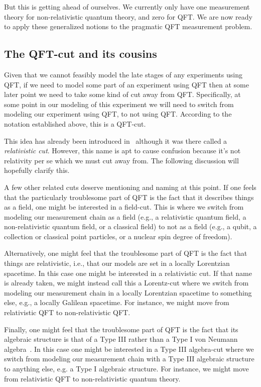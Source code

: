 \documentclass[prd,twocolumn,superscriptaddress,floatfix,amsmath,amssymb,amsfonts,nofootinbib]{revtex4-2}
\begin{document}
But this is getting ahead of ourselves. We currently only have one measurement theory for non-relativistic quantum theory, and zero for QFT. We are now ready to apply these generalized notions to the pragmatic QFT measurement problem.

\subsection{The QFT-cut and its cousins}
Given that we cannot feasibly model the late stages of any experiments using QFT, if we need to model some part of an experiment using QFT then at some later point we need to take some kind of cut away from QFT. Specifically, at some point in our modeling of this experiment we will need to switch from modeling our experiment using QFT, to not using QFT. According to the notation established above, this is a QFT-cut. 

This idea has already been introduced in~\cite{TaleOfTwo} although it was there called a \textit{relativistic cut}. However, this name is apt to cause confusion because it's not relativity per se which we must cut away from. The following discussion will hopefully clarify this.

A few other related cuts deserve mentioning and naming at this point. If one feels that the particularly troublesome part of QFT is the fact that it describes things as a field, one might be interested in a field-cut. This is where we switch from modeling our measurement chain as a field (e.g., a relativistic quantum field, a non-relativistic quantum field, or a classical field) to not as a field (e.g., a qubit, a collection or classical point particles, or a nuclear spin degree of freedom).

Alternatively, one might feel that the troublesome part of QFT is the fact that things are relativistic, i.e., that our models are set in a locally Lorentzian spacetime. In this case one might be interested in a relativistic cut. If that name is already taken, we might instead call this a Lorentz-cut where we switch from modeling our measurement chain in a locally Lorentzian spacetime to something else, e.g., a locally Galilean spacetime. For instance, we might move from relativistic QFT to non-relativistic QFT.

Finally, one might feel that the troublesome part of QFT is the fact that its algebraic structure is that of a Type III rather than a Type I von Neumann algebra~\cite{Witten,sep-qt-nvd}. In this case one might be interested in a Type III algebra-cut where we switch from modeling our measurement chain with a Type III algebraic structure to anything else, e.g. a Type I algebraic structure. For instance, we might move from relativistic QFT to non-relativistic quantum theory.
\end{document}
